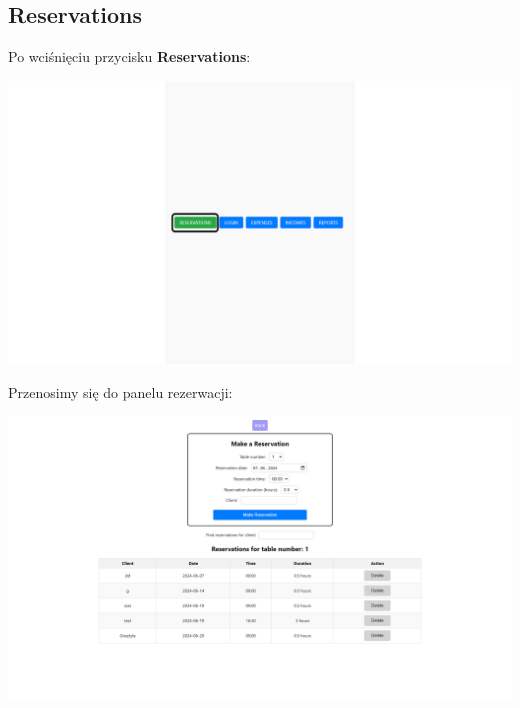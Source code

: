 \documentclass[12pt]{article}
\begin{document}
\newpage
\subsection{Reservations}
\begin{minipage}{\textwidth}
\noindent Po wciśnięciu przycisku \textbf{Reservations}:
\begin{center}
\includegraphics[width=\textwidth]{media/Reservations.png}
\end{center}
\end{minipage}

\begin{minipage}{\textwidth}
\noindent Przenosimy się do panelu rezerwacji:
\begin{center}
\includegraphics[width=\textwidth]{media/Reservations_in.png}
\end{center}
\end{minipage}
\end{document}
